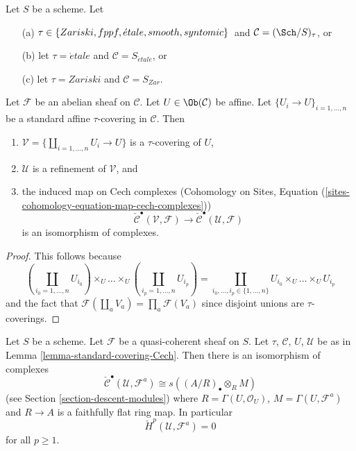 \begin{lemma}
\label{lemma-standard-covering-Cech}
Let $S$ be a scheme. Let
\begin{enumerate}
\item[(a)] $\tau \in \{Zariski, \linebreak[0] fppf, \linebreak[0]
\acute{e}tale, \linebreak[0] smooth, \linebreak[0] syntomic\}$\
and $\mathcal{C} = (\Sch/S)_\tau$, or
\item[(b)] let $\tau = \acute{e}tale$ and $\mathcal{C} = S_{\acute{e}tale}$, or
\item[(c)] let $\tau = Zariski$ and $\mathcal{C} = S_{Zar}$.
\end{enumerate}
Let $\mathcal{F}$ be an abelian sheaf on $\mathcal{C}$.
Let $U \in \Ob(\mathcal{C})$ be affine.
Let $\{U_i \to U\}_{i = 1, \ldots, n}$ be a standard affine
$\tau$-covering in $\mathcal{C}$. Then
\begin{enumerate}
\item $\mathcal{V} = \{\coprod_{i = 1, \ldots, n} U_i \to U\}$ is a
$\tau$-covering of $U$,
\item $\mathcal{U}$ is a refinement of $\mathcal{V}$, and
\item the induced map on Cech complexes
(Cohomology on Sites,
Equation (\ref{sites-cohomology-equation-map-cech-complexes}))
$$
\check{\mathcal{C}}^\bullet(\mathcal{V}, \mathcal{F})
\longrightarrow
\check{\mathcal{C}}^\bullet(\mathcal{U}, \mathcal{F})
$$
is an isomorphism of complexes.
\end{enumerate}
\end{lemma}

\begin{proof}
This follows because
$$
\textstyle(\coprod_{i_0 = 1, \ldots, n} U_{i_0}) \times_U
\ldots \times_U
(\coprod_{i_p = 1, \ldots, n} U_{i_p})
=
\coprod_{i_0, \ldots, i_p \in \{1, \ldots, n\}}
U_{i_0} \times_U \ldots \times_U U_{i_p}
$$
and the fact that $\mathcal{F}(\coprod_a V_a) = \prod_a \mathcal{F}(V_a)$
since disjoint unions are $\tau$-coverings.
\end{proof}

\begin{lemma}
\label{lemma-standard-covering-Cech-quasi-coherent}
Let $S$ be a scheme. Let $\mathcal{F}$ be a quasi-coherent sheaf on $S$.
Let $\tau$, $\mathcal{C}$, $U$, $\mathcal{U}$ be as in
Lemma \ref{lemma-standard-covering-Cech}. Then there is an isomorphism
of complexes
$$
\check{\mathcal{C}}^\bullet(\mathcal{U}, \mathcal{F}^a)
\cong
s((A/R)_\bullet \otimes_R M)
$$
(see Section \ref{section-descent-modules})
where $R = \Gamma(U, \mathcal{O}_U)$, $M = \Gamma(U, \mathcal{F}^a)$
and $R \to A$ is a faithfully flat ring map. In particular
$$
\check{H}^p(\mathcal{U}, \mathcal{F}^a) = 0
$$
for all $p \geq 1$.
\end{lemma}

